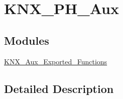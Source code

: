\hypertarget{group___k_n_x___p_h___aux}{}\section{K\+N\+X\+\_\+\+P\+H\+\_\+\+Aux}
\label{group___k_n_x___p_h___aux}
\subsection*{Modules}
\begin{DoxyCompactItemize}
\item 
\hyperlink{group___k_n_x___aux___exported___functions}{K\+N\+X\+\_\+\+Aux\+\_\+\+Exported\+\_\+\+Functions}
\end{DoxyCompactItemize}


\subsection{Detailed Description}
